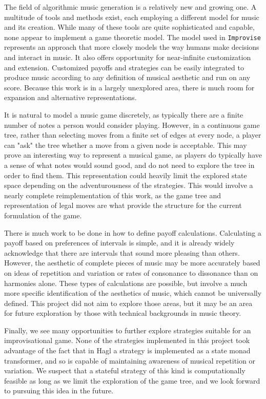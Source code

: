 \documentclass{article}
\begin{document}
The field of algorithmic music generation is a relatively new and
growing one. A multitude of tools and methods exist, each employing a
different model for music and its creation. While many of these tools
are quite sophisticated and capable, none appear to implement a game
theoretic model. The model used in \texttt{Improvise} represents an approach
that more closely models the way humans make decisions and interact in
music. It also offers opportunity for near-infinite customization and
extension. Customized payoffs and strategies can be easily integrated to
produce music according to any definition of musical aesthetic and run
on any score. Because this work is in a largely unexplored area, there
is much room for expansion and alternative representations.

It is natural to model a music game discretely, as typically there are a finite number of notes a person would consider playing.  However, in a continuous game tree, rather than selecting moves from
a finite set of edges at every node, a player can "ask" the tree
whether a move from a given node is acceptable.  This may
prove an interesting way to represent a musical game, as players do typically
have a sense of what notes would sound good, and do not need to explore
the tree in order to find them. This representation could heavily limit the explored
state space depending on the adventurousness of the strategies.
This would involve a nearly complete reimplementation of this work,
as the game tree and representation of legal moves are what provide the
structure for the current formulation of the game.

There is much work to be done in how to define payoff calculations. 
Calculating a payoff based on preferences of intervals is
simple, and it is already widely acknowledge that there are intervals
that sound more pleasing than others. However, the aesthetic of complete 
pieces of music may be more accurately based on ideas of repetition and
variation or rates of consonance to dissonance than on harmonies alone.
These types of calculations are possible, but involve a much more
specific identification of the aesthetics of music, which cannot be 
universally defined. This project did not aim to explore those areas, but it 
may be an area for future exploration by those with technical
backgrounds in music theory.

Finally, we see many opportunities to further explore strategies suitable for an 
improvisational game.  None of the strategies implemented in this project 
took advantage of the fact that in Hagl a strategy is implemented as a state 
monad transformer, and so is capable of maintaining awareness of musical  
repetition or variation. We suspect that a stateful strategy of this kind
is computationally feasible as long as we limit the exploration of the game tree, and we look forward to pursuing this idea in the future.
\end{document}
